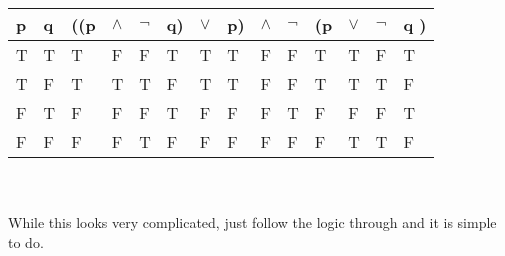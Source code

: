 \documentclass{article}[18pt]
\begin{document}
\begin{tabular}{|l|l|llllllllllll}
\cline{1-2}
p & q & ((p                    & $\land$                & $\lnot$                & q)                     & $\lor$                 & p)                     & $\land$                & $\lnot$                 & (p                     & $\lor$                 & $\lnot$                & q                     ) \\ \hline
T & T & \multicolumn{1}{l|}{T} & \multicolumn{1}{l|}{F} & \multicolumn{1}{l|}{F} & \multicolumn{1}{l|}{T} & \multicolumn{1}{l|}{T} & \multicolumn{1}{l|}{T} & \multicolumn{1}{l|}{F} & \multicolumn{1}{l|}{F} & \multicolumn{1}{l|}{T} & \multicolumn{1}{l|}{T} & \multicolumn{1}{l|}{F} & \multicolumn{1}{l|}{T} \\ \hline
T & F & \multicolumn{1}{l|}{T} & \multicolumn{1}{l|}{T} & \multicolumn{1}{l|}{T} & \multicolumn{1}{l|}{F} & \multicolumn{1}{l|}{T} & \multicolumn{1}{l|}{T} & \multicolumn{1}{l|}{F} & \multicolumn{1}{l|}{F} & \multicolumn{1}{l|}{T} & \multicolumn{1}{l|}{T} & \multicolumn{1}{l|}{T} & \multicolumn{1}{l|}{F} \\ \hline
F & T & \multicolumn{1}{l|}{F} & \multicolumn{1}{l|}{F} & \multicolumn{1}{l|}{F} & \multicolumn{1}{l|}{T} & \multicolumn{1}{l|}{F} & \multicolumn{1}{l|}{F} & \multicolumn{1}{l|}{F} & \multicolumn{1}{l|}{T} & \multicolumn{1}{l|}{F} & \multicolumn{1}{l|}{F} & \multicolumn{1}{l|}{F} & \multicolumn{1}{l|}{T} \\ \hline
F & F & \multicolumn{1}{l|}{F} & \multicolumn{1}{l|}{F} & \multicolumn{1}{l|}{T} & \multicolumn{1}{l|}{F} & \multicolumn{1}{l|}{F} & \multicolumn{1}{l|}{F} & \multicolumn{1}{l|}{F} & \multicolumn{1}{l|}{F} & \multicolumn{1}{l|}{F} & \multicolumn{1}{l|}{T} & \multicolumn{1}{l|}{T} & \multicolumn{1}{l|}{F} \\ \hline
\end{tabular}
\\
\\
While this looks very complicated, just follow the logic through and it is simple to do.
\end{document}
